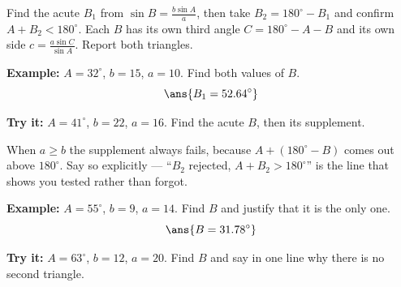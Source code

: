 \documentclass[12pt]{article}
\begin{document}

\begin{formulabox}
Find the acute $B_1$ from $\sin B = \frac{b\sin A}{a}$, then take
$B_2 = 180^\circ - B_1$ and confirm $A + B_2 < 180^\circ$. Each $B$ has its own
third angle $C = 180^\circ - A - B$ and its own side
$c = \frac{a\sin C}{\sin A}$. Report both triangles.
\end{formulabox}

\begin{examplebox}
\textbf{Example:} $A = 32^\circ$, $b = 15$, $a = 10$. Find both values of $B$.
\[ \ans{B_1 = 52.64^\circ} \]
\end{examplebox}

\begin{tryitbox}
\textbf{Try it:} $A = 41^\circ$, $b = 22$, $a = 16$. Find the acute $B$, then
its supplement.

\end{tryitbox}


\begin{formulabox}
When $a \ge b$ the supplement always fails, because $A + (180^\circ - B)$ comes
out above $180^\circ$. Say so explicitly --- ``$B_2$ rejected, $A + B_2 >
180^\circ$'' is the line that shows you tested rather than forgot.
\end{formulabox}

\begin{examplebox}
\textbf{Example:} $A = 55^\circ$, $b = 9$, $a = 14$. Find $B$ and justify that
it is the only one.
\[ \ans{B = 31.78^\circ} \]
\end{examplebox}

\begin{tryitbox}
\textbf{Try it:} $A = 63^\circ$, $b = 12$, $a = 20$. Find $B$ and say in one
line why there is no second triangle.

\end{tryitbox}
\end{document}

